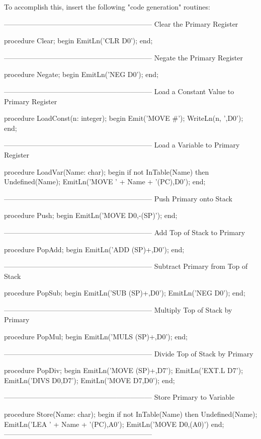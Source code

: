 \documentclass[float=false, crop=false]{standalone}
\begin{document}
To accomplish this, insert the following "code generation" routines:

\begin{code}
{---------------------------------------------------------------}
{ Clear the Primary Register }

procedure Clear;
begin
   EmitLn('CLR D0');
end;


{---------------------------------------------------------------}
{ Negate the Primary Register }

procedure Negate;
begin
   EmitLn('NEG D0');
end;


{---------------------------------------------------------------}
{ Load a Constant Value to Primary Register }

procedure LoadConst(n: integer);
begin
   Emit('MOVE #');
   WriteLn(n, ',D0');
end;


{---------------------------------------------------------------}
{ Load a Variable to Primary Register }

procedure LoadVar(Name: char);
begin
   if not InTable(Name) then Undefined(Name);
   EmitLn('MOVE ' + Name + '(PC),D0');
end;


{---------------------------------------------------------------}
{ Push Primary onto Stack }

procedure Push;
begin
   EmitLn('MOVE D0,-(SP)');
end;


{---------------------------------------------------------------}
{ Add Top of Stack to Primary }

procedure PopAdd;
begin
   EmitLn('ADD (SP)+,D0');
end;


{---------------------------------------------------------------}
{ Subtract Primary from Top of Stack }

procedure PopSub;
begin
   EmitLn('SUB (SP)+,D0');
   EmitLn('NEG D0');
end;


{---------------------------------------------------------------}
{ Multiply Top of Stack by Primary }

procedure PopMul;
begin
   EmitLn('MULS (SP)+,D0');
end;


{---------------------------------------------------------------}
{ Divide Top of Stack by Primary }

procedure PopDiv;
begin
   EmitLn('MOVE (SP)+,D7');
   EmitLn('EXT.L D7');
   EmitLn('DIVS D0,D7');
   EmitLn('MOVE D7,D0');
end;


{---------------------------------------------------------------}
{ Store Primary to Variable }

procedure Store(Name: char);
begin
   if not InTable(Name) then Undefined(Name);
   EmitLn('LEA ' + Name + '(PC),A0');
   EmitLn('MOVE D0,(A0)')
end;
{---------------------------------------------------------------}
\end{code}
\end{document}
